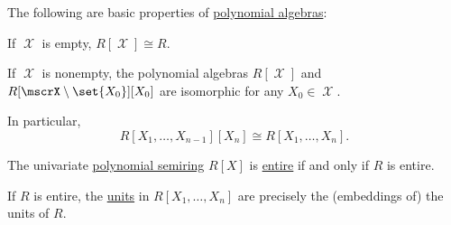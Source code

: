 \begin{proposition}\label{thm:def:polynomial_algebra}
  The following are basic properties of \hyperref[def:polynomial_algebra]{polynomial algebras}:
  \begin{thmenum}
     If \( \mscrX \) is empty, \( R[\mscrX] \cong R \).

     If \( \mscrX \) is nonempty, the polynomial algebras \( R[\mscrX] \) and \( R[\mscrX \setminus \set{ X_0 }][X_0] \) are isomorphic for any \( X_0 \in \mscrX \).

    In particular,
    \begin{equation*}
      R[X_1, \ldots, X_{n-1}][X_n] \cong R[X_1, \ldots, X_n].
    \end{equation*}

     The univariate \hyperref[def:polynomial_algebra]{polynomial semiring} \( R[X] \) is \hyperref[def:entire_semiring]{entire} if and only if \( R \) is entire.

     If \( R \) is entire, the \hyperref[def:divisibility/unit]{units} in \( R[X_1, \ldots, X_n] \) are precisely the (embeddings of) the units of \( R \).
  \end{thmenum}
\end{proposition}
